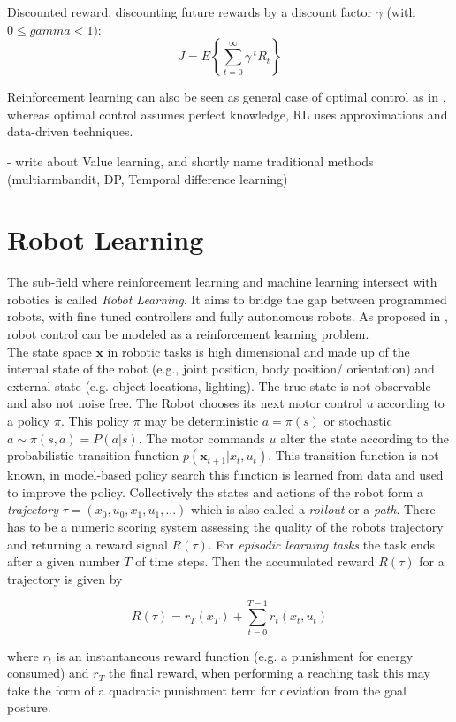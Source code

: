 Discounted reward, discounting future rewards by a discount factor $\gamma$
(with $0 \leq gamma < 1)$:
$$ J = E \left\{\sum^{\infty}_{t=0} \gamma^{\; t} R_t \right\} $$

Reinforcement learning can also be seen as
general case of optimal control as in \citet{sutton1992reinforcement},
whereas optimal control assumes perfect knowledge, RL uses approximations
and data-driven techniques.

- write about Value learning, and shortly name traditional methods (multiarmbandit,
DP, Temporal difference learning)


\section{Robot Learning}
The sub-field where reinforcement learning and machine learning
intersect with robotics is called \textit{Robot Learning}. It aims to bridge
the gap between programmed robots,
with fine tuned controllers  and fully autonomous robots.
As proposed in \citet{deisenroth2013survey}, robot control can be modeled as
a reinforcement learning problem. \\
The state space $\mathbf{x}$ in robotic tasks is high dimensional and made up of
the internal state of the robot (e.g., joint position, body position/ orientation)
and external state (e.g. object locations, lighting). The true state is
not observable and also not noise free. 
The Robot chooses its next motor control $u$ according to a policy $\pi$.
This policy $\pi$ may
be deterministic $a = \pi(s)$ or stochastic $a \sim \pi(s,a) = P(a | s)$.
The motor commands $u$ alter the state according to the probabilistic
transition function $p(\mathbf{x}_{t+1} | x_t, u_t)$. This transition function
is not known, in model-based policy search this function is learned from data and
used to improve the policy.
Collectively the states and actions of the robot form a
\textit{trajectory} $\tau = (x_0, u_0, x_1, u_1,...)$ which is also called
a \textit{rollout} or a \textit{path}.
There has to be a numeric scoring system assessing the quality
of the robots trajectory and returning a reward signal $R(\tau)$.
For \textit{episodic learning tasks} the task ends after a given number $T$ of time
steps. Then the accumulated reward $R(\tau)$ for a trajectory is given by

$$ R(\tau) = r_T(x_T) + \sum^{T-1}_{t=0} r_t(x_t,u_t) $$

where $r_t$ is an instantaneous reward function (e.g. a punishment for energy consumed)
and $r_T$ the final reward, when performing a reaching task this may take the
form of a quadratic punishment term for deviation from the goal posture.

